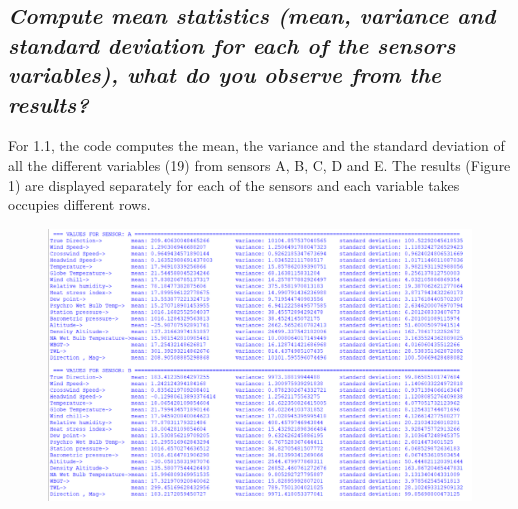 \documentclass[a4paper,12pt]{article} %
\begin{document}
\subsection{\it Compute mean statistics (mean, variance and standard deviation for each of the sensors variables), what do you observe from the results?} %




For 1.1, the code computes the mean, 
the variance and the standard deviation of 
all the different variables (19) from sensors A, B, C, D and E. 
The results (Figure 1) are displayed separately for each of the sensors and each variable takes occupies different rows.




\begin{figure}[H]
    \centering
    \includegraphics[width=\textwidth]{Graphs/Statistcal Indicators AB.PNG}
\end{figure}
\end{document}
